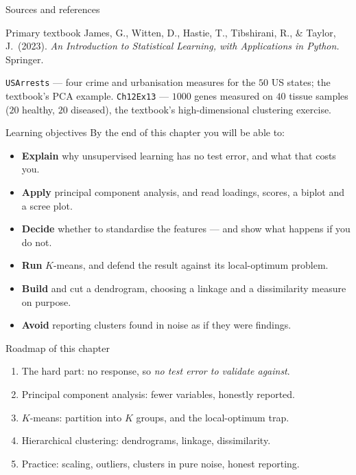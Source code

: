 \documentclass[aspectratio=169,11pt]{beamer}
\begin{document}
\begin{frame}{Sources and references}
  \begin{block}{Primary textbook}
    James, G., Witten, D., Hastie, T., Tibshirani, R., \& Taylor, J.\ (2023).
    \emph{An Introduction to Statistical Learning, with Applications in
    Python.} Springer.
  \end{block}
  \begin{readme}
    \texttt{USArrests} --- four crime and urbanisation measures for the $50$ US states;
    the textbook's PCA example. \texttt{Ch12Ex13} --- $1000$ genes measured on
    $40$ tissue samples ($20$ healthy, $20$ diseased), the textbook's
    high-dimensional clustering exercise.
  \end{readme}
\end{frame}

\begin{frame}{Learning objectives}
  By the end of this chapter you will be able to:
  \begin{itemize}
    \item \textbf{Explain} why unsupervised learning has no test error, and what
          that costs you.
    \item \textbf{Apply} principal component analysis, and read loadings, scores,
          a biplot and a scree plot.
    \item \textbf{Decide} whether to standardise the features --- and show what
          happens if you do not.
    \item \textbf{Run} $K$-means, and defend the result against its
          local-optimum problem.
    \item \textbf{Build} and cut a dendrogram, choosing a linkage and a
          dissimilarity measure on purpose.
    \item \textbf{Avoid} reporting clusters found in noise as if they were
          findings.
  \end{itemize}
\end{frame}

\begin{frame}{Roadmap of this chapter}
  \begin{takeaway}
    \begin{enumerate}
      \item The hard part: no response, so \emph{no test error to validate against}.
      \item Principal component analysis: fewer variables, honestly reported.
      \item $K$-means: partition into $K$ groups, and the local-optimum trap.
      \item Hierarchical clustering: dendrograms, linkage, dissimilarity.
      \item Practice: scaling, outliers, clusters in pure noise, honest reporting.
    \end{enumerate}
  \end{takeaway}
\end{frame}
\end{document}
